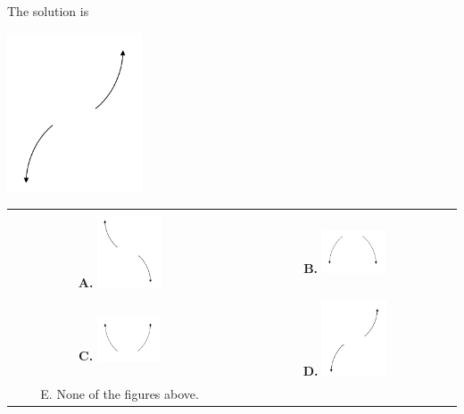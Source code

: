 \documentclass{article}[14pt]
\begin{document}
 
 The solution is  
 \begin{center} \includegraphics[width=0.3\textwidth]{../Figures/endBehaviorPositiveOddC.png} \end{center}\begin{tabular}{|c|c|} 
\hline 
 & \tabularnewline 
 \textbf{A.} \includegraphics[width=0.3\textwidth]{../Figures/endBehaviorNegativeOddC.png} & \textbf{B.} \includegraphics[width=0.3\textwidth]{../Figures/endBehaviorNegativeEvenC.png} \tabularnewline 
\hline 
 & \tabularnewline 
 \textbf{C.} \includegraphics[width=0.3\textwidth]{../Figures/endBehaviorPositiveEvenC.png} & \textbf{D.} \includegraphics[width=0.3\textwidth]{../Figures/endBehaviorPositiveOddC.png} \tabularnewline 
\hline 
 E. None of the figures above. & \tabularnewline 
\hline 
 \end{tabular} 
 
\end{document}

